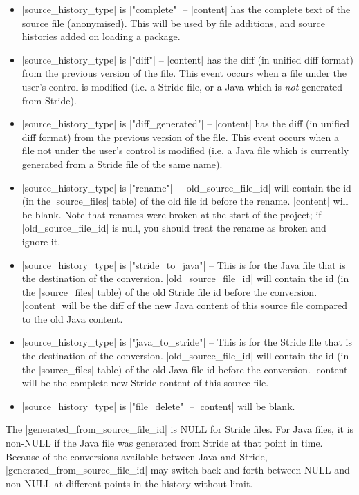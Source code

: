 \documentclass{report}
\begin{document}
\begin{itemize}
\item |source_history_type| is |"complete"| -- |content| has the complete text
  of the source file (anonymised).  This will be
  used by file additions, and source histories added on loading a package.
\item |source_history_type| is |"diff"| -- |content| has the diff (in unified diff format) from
  the previous version of the file.  This event occurs when a file under the user's control
  is modified (i.e. a Stride file, or a Java which is \textit{not} generated from Stride).
\item |source_history_type| is |"diff_generated"| -- |content| has the diff (in unified diff format) from
  the previous version of the file.  This event occurs when a file not under the user's control
  is modified (i.e. a Java file which is currently generated from a Stride file of the same name).
\item |source_history_type| is |"rename"| -- |old_source_file_id| will contain the
  id (in the |source_files| table) of the old file id before the rename.  |content| will be blank.
  Note that renames were broken at the start of the project; if |old_source_file_id| is null, you should
  treat the rename as broken and ignore it.
\item |source_history_type| is |"stride_to_java"| -- This is for the Java file that is
  the destination of the conversion.  |old_source_file_id| will contain the
  id (in the |source_files| table) of the old Stride file id before the conversion.
  |content| will be the diff of the new Java content of this source file compared to the old Java content.
\item |source_history_type| is |"java_to_stride"| -- This is for the Stride file that is
  the destination of the conversion.  |old_source_file_id| will contain the
  id (in the |source_files| table) of the old Java file id before the conversion.
  |content| will be the complete new Stride content of this source file.
\item |source_history_type| is |"file_delete"| -- |content| will be blank.
\end{itemize}

The |generated_from_source_file_id| is NULL for Stride files.  For Java files,
it is non-NULL if the Java file was generated from Stride at that point in time.
Because of the conversions available between Java and Stride, |generated_from_source_file_id|
may switch back and forth between NULL and non-NULL at different points in the history
without limit.
\end{document}
